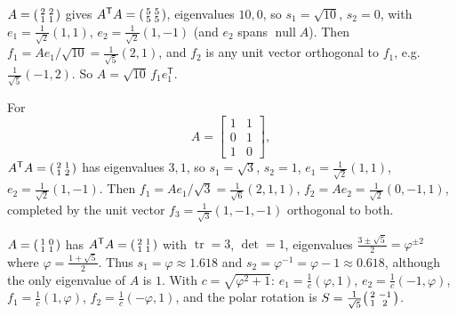 \documentclass[10pt]{scrartcl}
\DeclareMathOperator{\tr}{tr}\DeclareMathOperator{\nul}{null}\DeclareMathOperator{\range}{range}\DeclareMathOperator{\spn}{span}
\begin{document}
\begin{example*}
  $A=\begin{psmallmatrix}2&2\\1&1\end{psmallmatrix}$ gives $A^{\mathsf T}A=\begin{psmallmatrix}5&5\\5&5\end{psmallmatrix}$, eigenvalues $10,0$, so $s_1=\sqrt{10}$, $s_2=0$, with $e_1=\frac{1}{\sqrt{2}}(1,1)$, $e_2=\frac{1}{\sqrt{2}}(1,-1)$ (and $e_2$ spans $\nul A$). Then $f_1=Ae_1/\sqrt{10}=\frac{1}{\sqrt{5}}(2,1)$, and $f_2$ is any unit vector orthogonal to $f_1$, e.g.\ $\frac{1}{\sqrt{5}}(-1,2)$. So $A=\sqrt{10}\,f_1 e_1^{\mathsf T}$.
\end{example*}

\begin{example*}
  For
  \[
    A = \begin{bmatrix}1&1\\0&1\\1&0\end{bmatrix},
  \]
  $A^{\mathsf T}A=\begin{psmallmatrix}2&1\\1&2\end{psmallmatrix}$ has eigenvalues $3,1$, so $s_1=\sqrt{3}$, $s_2=1$, $e_1=\frac{1}{\sqrt{2}}(1,1)$, $e_2=\frac{1}{\sqrt{2}}(1,-1)$. Then $f_1=Ae_1/\sqrt3=\frac{1}{\sqrt{6}}(2,1,1)$, $f_2=Ae_2=\frac{1}{\sqrt{2}}(0,-1,1)$, completed by the unit vector $f_3=\frac{1}{\sqrt{3}}(1,-1,-1)$ orthogonal to both.
\end{example*}

\begin{example*}
  $A=\begin{psmallmatrix}1&0\\1&1\end{psmallmatrix}$ has $A^{\mathsf T}A=\begin{psmallmatrix}2&1\\1&1\end{psmallmatrix}$ with $\tr=3$, $\det=1$, eigenvalues $\frac{3\pm\sqrt{5}}{2}=\varphi^{\pm2}$ where $\varphi=\frac{1+\sqrt{5}}{2}$. Thus $s_1=\varphi\approx1.618$ and $s_2=\varphi^{-1}=\varphi-1\approx0.618$, although the only eigenvalue of $A$ is $1$. With $c=\sqrt{\varphi^2+1}$: $e_1=\frac{1}{c}(\varphi,1)$, $e_2=\frac{1}{c}(-1,\varphi)$, $f_1=\frac{1}{c}(1,\varphi)$, $f_2=\frac{1}{c}(-\varphi,1)$, and the polar rotation is $S=\frac{1}{\sqrt{5}}\begin{psmallmatrix}2&-1\\1&2\end{psmallmatrix}$.
\end{example*}
\end{document}

